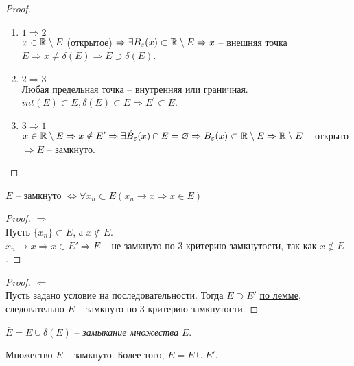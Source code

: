     \begin{proof}
        \begin{enumerate}
            \item $1 \Rightarrow 2$\\
            $x \in \mathbb{R} \setminus E$ (открытое) $\Rightarrow \exists B_{\varepsilon}(x) \subset \mathbb{R} \setminus E \Rightarrow x$ -- внешняя точка $E \Rightarrow x \neq \delta (E) \Rightarrow E \supset \delta (E)$.
            \item $2 \Rightarrow 3$\\
            Любая предельная точка -- внутренняя или граничная. $int(E) \subset E, \delta (E) \subset E \Rightarrow E^{'} \subset E$.
            \item $3 \Rightarrow 1$\\
            $x \in \mathbb{R} \setminus E \Rightarrow x \notin E' \Rightarrow \exists \mathring{B}_{\varepsilon}(x) \cap E = \varnothing \Rightarrow B_{\varepsilon}(x) \subset \mathbb{R} \setminus E \Rightarrow \mathbb{R} \setminus E$ -- открыто $\Rightarrow E$ -- замкнуто.
        \end{enumerate}
    \end{proof}

    \begin{corollary}
        $E$ -- замкнуто $\iff \forall {x_{n}} \subset E (x_{n} \to x \Rightarrow x \in E)$
    \end{corollary}

    \begin{proof} $\Rightarrow$\\
        Пусть $\{x_{n}\} \subset E$, а $x \notin E$.\\
        $x_{n} \to x \Rightarrow x \in E' \Rightarrow E$ -- не замкнуто по 3 критерию замкнутости, так как $x \notin E$.
    \end{proof}
    
    \begin{proof} $\Leftarrow$\\
        Пусть задано условие на последовательности. Тогда $E \supset E'$ \hyperlink{tar4}{по лемме}, следовательно $E$ -- замкнуто по 3 критерию замкнутости.
    \end{proof}
    
    \begin{definition}
        $\bar{E} = E \cup \delta (E)$ -- \textit{замыкание множества} $E$.
    \end{definition}
    
    \begin{lemma}
        Множество $\bar{E}$ -- замкнуто. Более того, $\bar{E} = E \cup E'$.
    \end{lemma}
    
